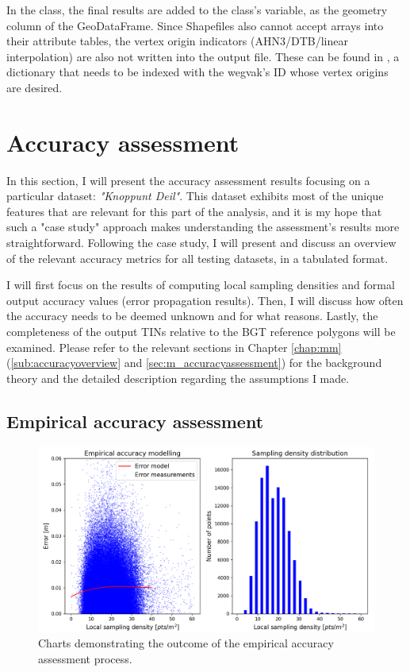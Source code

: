 In the  class, the final results are added to the class's  variable, as the  geometry column of the GeoDataFrame. Since Shapefiles also cannot accept arrays into their attribute tables, the vertex origin indicators (AHN3/DTB/linear interpolation) are also not written into the output file. These can be found in , a dictionary that needs to be indexed with the wegvak's ID whose vertex origins are desired.

\section{Accuracy assessment}
\label{sec:accuracy}

In this section, I will present the accuracy assessment results focusing on a particular dataset: \textit{"Knoppunt Deil"}. This dataset exhibits most of the unique features that are relevant for this part of the analysis, and it is my hope that such a "case study" approach makes understanding the assessment's results more straightforward. Following the case study, I will present and discuss an overview of the relevant accuracy metrics for all testing datasets, in a tabulated format.

I will first focus on the results of computing local sampling densities and formal output accuracy values (error propagation results). Then, I will discuss how often the accuracy needs to be deemed unknown and for what reasons. Lastly, the completeness of the output TINs relative to the BGT reference polygons will be examined. Please refer to the relevant sections in Chapter \ref{chap:mm} (\ref{sub:accuracyoverview} and \ref{sec:m_accuracyassessment}) for the background theory and the detailed description regarding the assumptions I made.

\subsection{Empirical accuracy assessment}
\label{sub:accuracyempirical}

\begin{figure}
    \centering
    \includegraphics[width=\linewidth]{final_report/figs/empiricalaccuracy0.png}
    \caption{Charts demonstrating the outcome of the empirical accuracy assessment process.}
    \label{fig:empiricalaccuracy0}
\end{figure}

